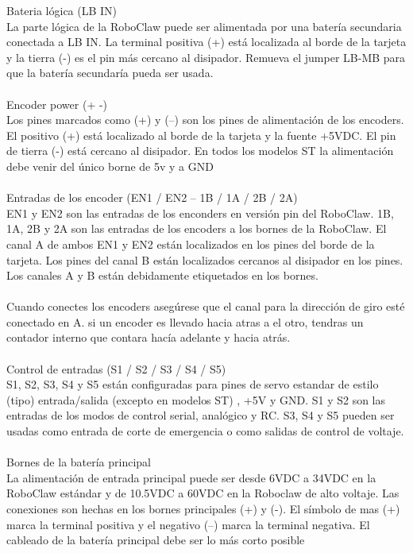 \documentclass[a4paper,usenames,dvipsnames,svgnames,table]{book}
\begin{document}
Bateria lógica (LB IN)\\
La parte lógica de la RoboClaw puede ser alimentada por una batería secundaria conectada a LB IN. La terminal positiva
(+) está localizada al borde de la tarjeta y la tierra (-) es el pin más cercano al disipador. Remueva el jumper LB-MB
para que la batería secundaría pueda ser usada.\\
\\
Encoder power (+ -)\\
Los pines marcados como (+) y (–) son los pines de alimentación  de los encoders. El positivo (+) está localizado al
borde de la tarjeta y la fuente +5VDC. El pin de tierra (-) está cercano al disipador. En todos los modelos ST la
alimentación debe venir del único borne de 5v  y a GND\\
\\
Entradas de los encoder (EN1 / EN2 – 1B / 1A / 2B / 2A)\\ 
EN1 y EN2 son las entradas de los enconders en versión pin del RoboClaw. 1B, 1A, 2B y 2A son las entradas de los encoders
a los bornes de la RoboClaw. El canal A de ambos EN1 y EN2 están localizados en los pines del borde de la tarjeta.
Los pines del canal B están localizados cercanos al disipador en los pines. Los canales A y B están debidamente etiquetados
en los bornes.\\
\\
Cuando conectes los encoders asegúrese que el canal para la dirección de giro esté conectado en A. si un encoder es
llevado hacia atras a el otro, tendras un contador interno que contara hacía adelante y hacia atrás. \\
\\
Control de entradas (S1 / S2 / S3 / S4 / S5)\\
S1, S2, S3, S4 y S5 están configuradas para pines de servo estandar de estilo (tipo) entrada/salida (excepto en modelos ST)
, +5V y GND. S1 y S2 son las entradas  de los modos de control serial, analógico y RC. S3, S4 y S5 pueden ser usadas como
entrada de corte de emergencia o como salidas de control de voltaje.\\
\\
Bornes de la batería principal\\
La alimentación de entrada principal puede ser desde 6VDC a 34VDC en la RoboClaw estándar y de 10.5VDC a 60VDC en la Roboclaw
de alto voltaje. Las conexiones son hechas en los bornes principales (+) y (-). El símbolo de mas (+) marca la terminal
positiva y el negativo (–) marca la terminal negativa. El cableado de la batería principal debe ser lo más corto posible \\
\end{document}
